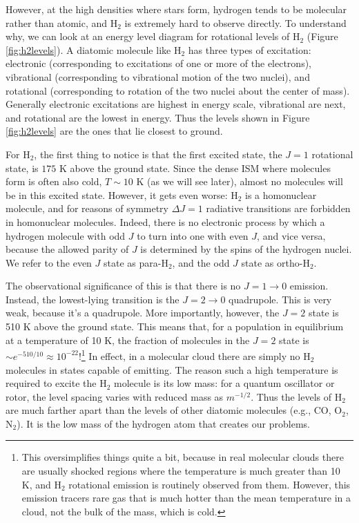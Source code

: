 However, at the high densities where stars form, hydrogen tends to be molecular rather than atomic, and H$_2$ is extremely hard to observe directly. To understand why, we can look at an energy level diagram for rotational levels of H$_2$ (Figure \ref{fig:h2levels}). A diatomic molecule like H$_2$ has three types of excitation: electronic (corresponding to excitations of one or more of the electrons), vibrational (corresponding to vibrational motion of the two nuclei), and rotational (corresponding to rotation of the two nuclei about the center of mass). Generally electronic excitations are highest in energy scale, vibrational are next, and rotational are the lowest in energy. Thus the levels shown in Figure \ref{fig:h2levels} are the ones that lie closest to ground.

For H$_2$, the first thing to notice is that the first excited state, the $J=1$ rotational state, is $175$ K above the ground state. Since the dense ISM where molecules form is often also cold, $T\sim 10$ K (as we will see later), almost no molecules will be in this excited state. However, it gets even worse: H$_2$ is a homonuclear molecule, and for reasons of symmetry $\Delta J = 1$ radiative transitions are forbidden in homonuclear molecules. Indeed, there is no electronic process by which a hydrogen molecule with odd $J$ to turn into one with even $J$, and vice versa, because the allowed parity of $J$ is determined by the spins of the hydrogen nuclei. We refer to the even $J$ state as para-H$_2$, and the odd $J$ state as ortho-H$_2$.

The observational significance of this is that there is no $J=1\rightarrow 0$ emission. Instead, the lowest-lying transition is the $J=2\rightarrow 0$ quadrupole. This is very weak, because it's a quadrupole. More importantly, however, the $J=2$ state is 510 K above the ground state. This means that, for a population in equilibrium at a temperature of 10 K, the fraction of molecules in the $J=2$ state is $\sim e^{-510/10} \approx 10^{-22}$!\footnote{This oversimplifies things quite a bit, because in real molecular clouds there are usually shocked regions where the temperature is much greater than 10 K, and H$_2$ rotational emission is routinely observed from them. However, this emission tracers rare gas that is much hotter than the mean temperature in a cloud, not the bulk of the mass, which is cold.} In effect, in a molecular cloud there are simply no H$_2$ molecules in states capable of emitting. The reason such a high temperature is required to excite the H$_2$ molecule is its low mass: for a quantum oscillator or rotor, the level spacing varies with reduced mass as $m^{-1/2}$. Thus the levels of H$_2$ are much farther apart than the levels of other diatomic molecules (e.g., CO, O$_2$, N$_2$). It is the low mass of the hydrogen atom that creates our problems.
  
